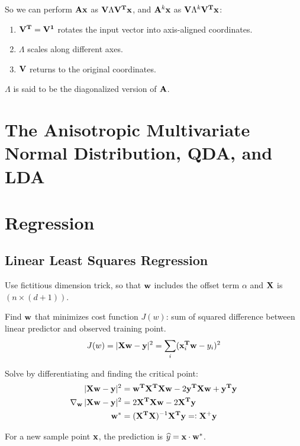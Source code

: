 So we can perform $\mathbf A\mathbf x$ as $\mathbf V\Lambda\mathbf V^{\mathbf{T}}\mathbf x$, and $\mathbf A^k\mathbf x$ as
$\mathbf V\Lambda^k\mathbf V^{\mathbf{T}}\mathbf x$:

\begin{enumerate}
\item $\mathbf V^{\mathbf{T}} = \mathbf V^{\mathbf 1}$ rotates the input vector into axis-aligned coordinates.
\item $\Lambda$ scales along different axes.
\item $\mathbf V$ returns to the original coordinates.
\end{enumerate}

$\Lambda$ is said to be the diagonalized version of $\mathbf A$.
\section{The Anisotropic Multivariate Normal Distribution, QDA, and LDA}

\newpage
\section{Regression}
\subsection{Linear Least Squares Regression}
Use fictitious dimension trick, so that $\mathbf w$ includes the offset term $\alpha$
and $\mathbf X$ is $(n \times (d + 1))$.
\\
\begin{mdframed}
Find $\mathbf w$ that minimizes cost function $J(w)$: sum of squared difference between
linear predictor and observed training point.
\begin{align*}
  J(w) = |\mathbf X \mathbf w - \mathbf y|^2 = \sum_i (\mathbf x_i^{\mathbf{T}}\mathbf w - y_i)^2
\end{align*}
\end{mdframed}

Solve by differentiating and finding the critical point:
\begin{align*}
  |\mathbf X \mathbf w - \mathbf y|^2          &= \mathbf w^{\mathbf{T}}\mathbf X^{\mathbf{T}}\mathbf X\mathbf w - 2\mathbf y^{\mathbf{T}}\mathbf X\mathbf w + \mathbf y^{\mathbf{T}}\mathbf y \\
  \operatorname{\nabla}_\mathbf w |\mathbf X \mathbf w - \mathbf y|^2 &= 2 \mathbf X^{\mathbf{T}}\mathbf X\mathbf w - 2\mathbf X^{\mathbf{T}}\mathbf y \\
  \mathbf w^*                    &= (\mathbf X^{\mathbf{T}}\mathbf X)^{-1}\mathbf X^{\mathbf{T}}\mathbf y =: \mathbf X^+\mathbf y
\end{align*}
\begin{mdframed}
For a new sample point $\mathbf x$, the prediction is $\widehat y = \mathbf x \cdot \mathbf w^*$.
\end{mdframed}

